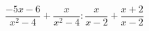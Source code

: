 \begin{ex}[type=expression]
	\begin{condition}
		\(\dfrac{-5x-6}{x^2-4}+\dfrac{x}{x^2-4}:\dfrac{x}{x-2}+\dfrac{x+2}{x-2}\)
	\end{condition}
\end{ex}